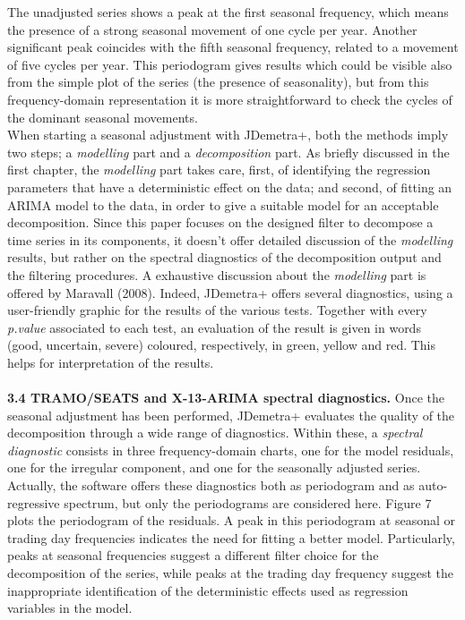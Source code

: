 \documentclass{article}
\begin{document}
The unadjusted series shows a peak at the first seasonal frequency, which means the presence of a strong seasonal movement of one cycle per year. Another significant peak coincides with the fifth seasonal frequency, related to a movement of five cycles per year. This periodogram gives results which could be visible also from the simple plot of the series (the presence of seasonality), but from this frequency-domain representation it is more straightforward to check the cycles of the dominant seasonal movements.\\When starting a seasonal adjustment with JDemetra+, both the methods imply two steps; a \textit{modelling} part and a \textit{decomposition} part. As briefly discussed in the first chapter, the \textit{modelling} part takes care, first, of identifying the regression parameters that have a deterministic effect on the data; and second, of fitting an ARIMA model to the data, in order to give a suitable model for an acceptable decomposition. Since this paper focuses on the designed filter to decompose a time series in its components, it doesn't offer detailed discussion of the \textit{modelling} results, but rather on the spectral diagnostics of the decomposition output and the filtering procedures. A exhaustive discussion about the \textit{modelling} part is offered by Maravall (2008). Indeed, JDemetra+ offers several diagnostics, using a user-friendly graphic for the results of the various tests. Together with every \textit{p.value} associated to each test, an evaluation of the result is given in words (good, uncertain, severe) coloured, respectively, in green, yellow and red. This helps for interpretation of the results.\\
\bigskip\\
\textbf{\small 3.4 TRAMO/SEATS and X-13-ARIMA spectral diagnostics.}
Once the seasonal adjustment has been performed, JDemetra+ evaluates the quality of the decomposition through a wide range of diagnostics. Within these, a \textit{spectral diagnostic} consists in three frequency-domain charts, one for the model residuals, one for the irregular component, and one for the seasonally adjusted series. Actually, the software offers these diagnostics both as periodogram and as auto-regressive spectrum, but only the periodograms are considered here. Figure 7 plots the periodogram of the residuals. A peak in this periodogram at  seasonal or trading day frequencies indicates the need for fitting a better model. Particularly, peaks at seasonal frequencies suggest a different filter choice for the decomposition of the series, while peaks at the trading day frequency suggest the inappropriate identification of the deterministic effects used as regression variables in the model.
\end{document}
